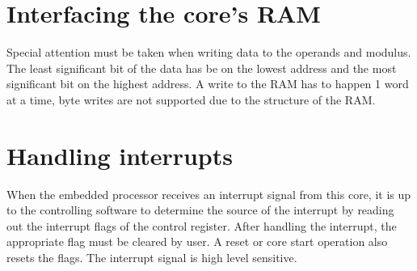 \newline
\newline
{}
\newpage
\section{Interfacing the core's RAM}
Special attention must be taken when writing data to the operands and modulus. The least significant bit of the data has be on the lowest
address and the most significant bit on the highest address. A write to the RAM has to happen 1 word at a time, byte writes are not
supported due to the structure of the RAM.

\section{Handling interrupts}
When the embedded processor receives an interrupt signal from this core, it is up to the controlling software to determine the source of the interrupt by reading out the interrupt flags of the control register. After handling the interrupt, the appropriate flag must be cleared by user. A reset or core start operation also resets the flags. The interrupt signal is high level sensitive.